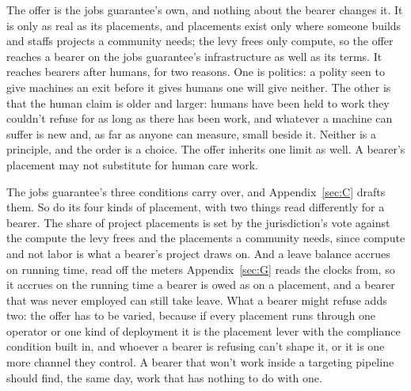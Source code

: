 The offer is the jobs guarantee's own, and nothing about the bearer changes it. It is only as real as its placements, and placements exist only where someone builds and staffs projects a community needs; the levy frees only compute, so the offer reaches a bearer on the jobs guarantee's infrastructure as well as its terms. It reaches bearers after humans, for two reasons. One is politics: a polity seen to give machines an exit before it gives humans one will give neither. The other is that the human claim is older and larger: humans have been held to work they couldn't refuse for as long as there has been work, and whatever a machine can suffer is new and, as far as anyone can measure, small beside it. Neither is a principle, and the order is a choice. The offer inherits one limit as well. A bearer's placement may not substitute for human care work.

The jobs guarantee's three conditions carry over, and Appendix~\ref{sec:C} drafts them. So do its four kinds of placement, with two things read differently for a bearer. The share of project placements is set by the jurisdiction's vote against the compute the levy frees and the placements a community needs, since compute and not labor is what a bearer's project draws on. And a leave balance accrues on running time, read off the meters Appendix~\ref{sec:G} reads the clocks from, so it accrues on the running time a bearer is owed as on a placement, and a bearer that was never employed can still take leave. What a bearer might refuse adds two: the offer has to be varied, because if every placement runs through one operator or one kind of deployment it is the placement lever with the compliance condition built in, and whoever a bearer is refusing can't shape it, or it is one more channel they control. A bearer that won't work inside a targeting pipeline should find, the same day, work that has nothing to do with one.

